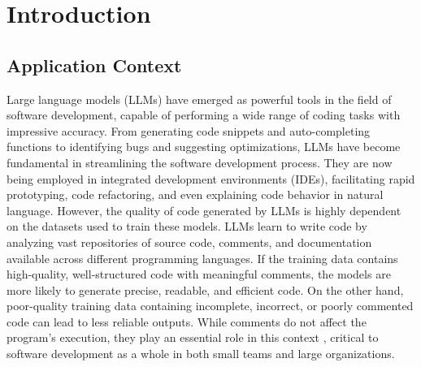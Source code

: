 
\chapter{Introduction} %

\label{Chapter1} %


\newcommand{\keyword}[1]{\textbf{#1}}
\newcommand{\tabhead}[1]{\textbf{#1}}
\newcommand{\code}[1]{\texttt{#1}}
\newcommand{\file}[1]{\texttt{\bfseries#1}}
\newcommand{\option}[1]{\texttt{\itshape#1}}


\section{Application Context} 
Large language models (LLMs) have emerged as powerful tools in the field of software development, capable of performing a wide range of coding tasks with impressive accuracy. From generating code snippets and auto-completing functions to identifying bugs and suggesting optimizations, LLMs have become fundamental in streamlining the software development process. They are now being employed in integrated development environments (IDEs), facilitating rapid prototyping, code refactoring, and even explaining code behavior in natural language.
However, the quality of code generated by LLMs is highly dependent on the datasets used to train these models. LLMs learn to write code by analyzing vast repositories of source code, comments, and documentation available across different programming languages. If the training data contains high-quality, well-structured code with meaningful comments, the models are more likely to generate precise, readable, and efficient code. On the other hand, poor-quality training data containing incomplete, incorrect, or poorly commented code can lead to less reliable outputs.
While comments do not affect the program’s execution, they play an essential role in this context \cite{codeReadability}  \cite{codeMaintainability}, critical to software development as a whole in both small teams and large organizations.

